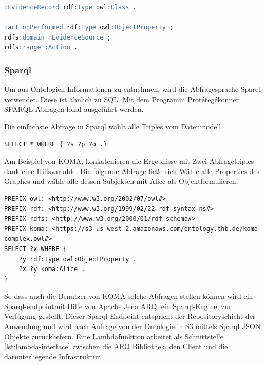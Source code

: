 \documentclass[
12pt,
english,
ngerman,
headsepline,
twoside,
openright,
numbers=noenddot,version=first
]{scrreprt}
\begin{document}
\begin{lstlisting}[language=SQL,caption={Darstellung von Triples in TURTLE},label={lst:turtle}]
:EvidenceRecord rdf:type owl:Class .

:actionPerformed rdf:type owl:ObjectProperty ;
rdfs:domain :EvidenceSource ;
rdfs:range :Action .
\end{lstlisting}


\subsubsection{Sparql}
Um aus Ontologien Informationen zu entnehmen, wird die Abfragesprache \acrfull{Sparql} 
verwendet. Diese ist ähnlich zu SQL. Mit dem Programm \glqq Protétegé\grqq können SPARQL Abfragen lokal ausgeführt werden.

Die einfachste Abfrage in Sparql wählt alle Triples vom Datenmodell.

\begin{lstlisting}[language=Sparql]
SELECT * WHERE { ?s ?p ?o .}
\end{lstlisting}

Am Beispiel von KOMA, konkatenieren die Ergebnisse mit Zwei Abfragetriples dank eine Hilfsvariable. Die folgende Abfrage ließe sich \glqq Wähle alle Properties des Graphes und wähle alle dessen Subjekten mit Alice als Objekt\grqq formulieren. \\
\begin{lstlisting}
PREFIX owl: <http://www.w3.org/2002/07/owl#>
PREFIX rdf: <http://www.w3.org/1999/02/22-rdf-syntax-ns#>
PREFIX rdfs: <http://www.w3.org/2000/01/rdf-schema#>
PREFIX koma: <https://s3-us-west-2.amazonaws.com/ontology.thb.de/koma-complex.owl#>
SELECT ?x WHERE {
	?y rdf:type owl:ObjectProperty .
	?x ?y koma:Alice .
}
\end{lstlisting}

So dass auch die Benutzer von \acrshort{KOMA} solche Abfragen stellen können wird ein \glqq Sparql-endpoint\grqq mit Hilfe von Apache Jena ARQ, ein Sparql-Engine, zur Verfügung gestellt. 
Dieser Sparql-Endpoint entspricht der Repositoryschicht der Anwendung und wird nach Anfrage von der Ontologie in S3 mittels Sparql JSON Objekte zurückliefern.
Eine Lambdafunktion arbeitet als Schnittstelle \ref{lst:lambda-interface} zwischen die ARQ Bibliothek, den Client und die darunterliegende Infrastruktur.
\end{document}
